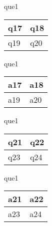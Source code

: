 \documentclass[13.5pt, varwidth=true]{beamer}
\begin{document}
\begin{frame}[shrink=19,fragile]
	\begin{beamercolorbox}[rounded=true, left, shadow=true,wd=14.8cm]{que1}
		\begin{tabular}{p{7cm} | p{7cm}}
			\parbox{7cm}{q17 } & \parbox{7cm}{q18 } \\ 
			\hline
			\parbox{7cm}{q19 } & \parbox{7cm}{q20 } \\
		\end{tabular}
	\end{beamercolorbox}
\end{frame}
\begin{frame}[shrink=19,fragile]
	\begin{beamercolorbox}[rounded=true, left, shadow=true,wd=14.8cm]{que1}
		\begin{tabular}{p{7cm} | p{7cm}}
			\textcolor{ared}{a17 }  & \textcolor{ared}{a18 } \\ 
			\hline
			\textcolor{ared}{a19 }  & \textcolor{ared}{a20 } \\
		\end{tabular}
	\end{beamercolorbox}
\end{frame}

\begin{frame}[shrink=19,fragile]
	\begin{beamercolorbox}[rounded=true, left, shadow=true,wd=14.8cm]{que1}
		\begin{tabular}{p{7cm} | p{7cm}}
			\parbox{7cm}{q21 } & \parbox{7cm}{q22 } \\ 
			\hline
			\parbox{7cm}{q23 } & \parbox{7cm}{q24 } \\
		\end{tabular}
	\end{beamercolorbox}
\end{frame}
\begin{frame}[shrink=19,fragile]
	\begin{beamercolorbox}[rounded=true, left, shadow=true,wd=14.8cm]{que1}
		\begin{tabular}{p{7cm} | p{7cm}}
			\textcolor{ared}{a21 }  & \textcolor{ared}{a22 } \\ 
			\hline
			\textcolor{ared}{a23 }  & \textcolor{ared}{a24 } \\
		\end{tabular}
	\end{beamercolorbox}
\end{frame}
\end{document}
